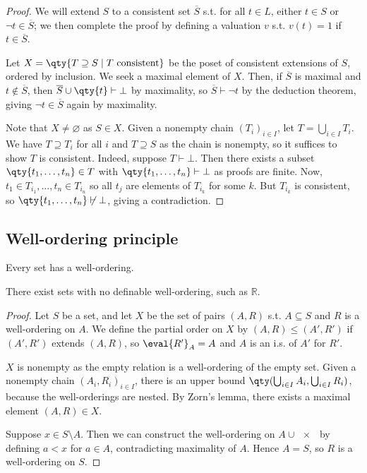 \begin{proof}
    We will extend $S$ to a consistent set $\overline S$ s.t. for all $t \in L$, either $t \in S$ or $\neg t \in \overline S$; we then complete the proof by defining a valuation $v$ s.t. $v(t) = 1$ if $t \in \overline S$.

    Let $X = \qty{T \supseteq S \mid T \text{ consistent}}$ be the poset of consistent extensions of $S$, ordered by inclusion.
    We seek a maximal element of $X$.
    Then, if $\overline S$ is maximal and $t \not\in \overline S$, then $\overline S \cup \qty{t} \vdash \bot$ by maximality, so $\overline S \vdash \neg t$ by the deduction theorem, giving $\neg t \in \overline S$ again by maximality.

    Note that $X \neq \varnothing$ as $S \in X$.
    Given a nonempty chain $(T_i)_{i \in I}$, let $T = \bigcup_{i \in I} T_i$.
    We have $T \supseteq T_i$ for all $i$ and $T \supseteq S$ as the chain is nonempty, so it suffices to show $T$ is consistent.
    Indeed, suppose $T \vdash \bot$.
    Then there exists a subset $\qty{t_1, \dots, t_n} \in T$ with $\qty{t_1, \dots, t_n} \vdash \bot$ as proofs are finite.
    Now, $t_1 \in T_{i_1}, \dots, t_n \in T_{i_n}$ so all $t_j$ are elements of $T_{i_k}$ for some $k$.
    But $T_{i_k}$ is consistent, so $\qty{t_1, \dots, t_n} \not\vdash \bot$, giving a contradiction.
\end{proof}

\subsection{Well-ordering principle}
\begin{theorem}
    Every set has a well-ordering.
\end{theorem}
There exist sets with no definable well-ordering, such as $\mathbb R$.
\begin{proof}
    Let $S$ be a set, and let $X$ be the set of pairs $(A, R)$ s.t. $A \subseteq S$ and $R$ is a well-ordering on $A$.
    We define the partial order on $X$ by $(A, R) \leq (A', R')$ if $(A', R')$ extends $(A, R)$, so $\eval{R'}_A = A$ and $A$ is an i.s. of $A'$ for $R'$.

    $X$ is nonempty as the empty relation is a well-ordering of the empty set.
    Given a nonempty chain $(A_i, R_i)_{i \in I}$, there is an upper bound $\qty(\bigcup_{i \in I} A_i, \bigcup_{i \in I} R_i)$, because the well-orderings are nested.
    By Zorn's lemma, there exists a maximal element $(A, R) \in X$.

    Suppose $x \in S \setminus A$.
    Then we can construct the well-ordering on $A \cup \qty{x}$ by defining $a < x$ for $a \in A$, contradicting maximality of $A$.
    Hence $A = S$, so $R$ is a well-ordering on $S$.
\end{proof}

